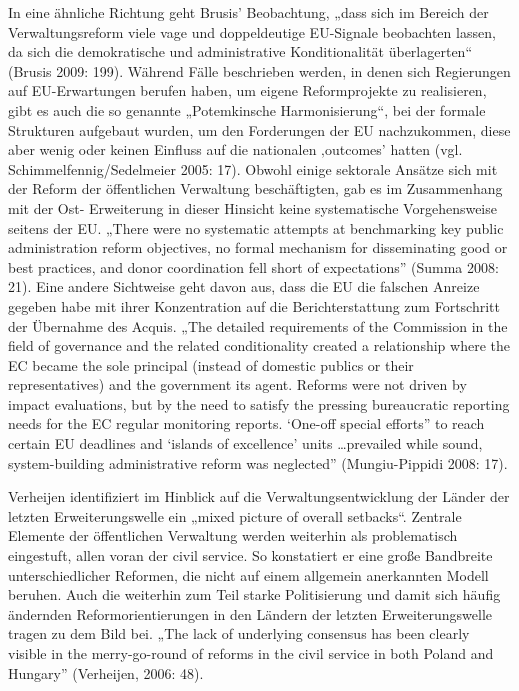 In eine ähnliche Richtung geht Brusis’ Beobachtung, „dass sich im Bereich der Verwaltungsreform viele vage und doppeldeutige EU-Signale beobachten lassen, da sich die demokratische und administrative Konditionalität überlagerten“ (Brusis 2009: 199). Während Fälle beschrieben werden, in denen sich Regierungen auf EU-Erwartungen berufen haben, um eigene Reformprojekte zu realisieren, gibt es auch die so genannte „Potemkinsche Harmonisierung“, bei der formale Strukturen aufgebaut wurden, um den Forderungen der EU nachzukommen, diese aber wenig oder keinen Einfluss auf die nationalen ‚outcomes’ hatten (vgl. Schimmelfennig/Sedelmeier 2005: 17). Obwohl einige sektorale Ansätze sich mit der Reform der öffentlichen Verwaltung beschäftigten, gab es im Zusammenhang mit der Ost- Erweiterung in dieser Hinsicht keine systematische Vorgehensweise seitens der EU. „There were no systematic attempts at benchmarking key public administration reform objectives, no formal mechanism for disseminating good or best practices, and donor coordination fell short of expectations” (Summa 2008: 21). Eine andere Sichtweise geht davon aus, dass die EU die falschen Anreize gegeben habe mit ihrer Konzentration auf die Berichterstattung zum Fortschritt der Übernahme des Acquis. „The detailed requirements of the Commission in the field of governance and the related conditionality created a relationship where the EC became the sole principal (instead of domestic publics or their representatives) and the government its agent. Reforms were not driven by impact evaluations, but by the need to satisfy the pressing bureaucratic reporting needs for the EC regular monitoring reports. ‘One-off special efforts” to reach certain EU deadlines and ‘islands of excellence’ units …prevailed while sound, system-building administrative reform was neglected” (Mungiu-Pippidi 2008: 17). \par

Verheijen identifiziert im Hinblick auf die Verwaltungsentwicklung der Länder der letzten Erweiterungswelle ein „mixed picture of overall setbacks“. Zentrale Elemente der öffentlichen Verwaltung werden weiterhin als problematisch eingestuft, allen voran der civil service. So konstatiert er eine große Bandbreite unterschiedlicher Reformen, die nicht auf einem allgemein anerkannten Modell beruhen. Auch die weiterhin zum Teil starke Politisierung und damit sich häufig ändernden Reformorientierungen in den Ländern der letzten Erweiterungswelle tragen zu dem Bild bei. „The lack of underlying consensus has been clearly visible in the merry-go-round of reforms in the civil service in both Poland and Hungary” (Verheijen, 2006: 48). \par

